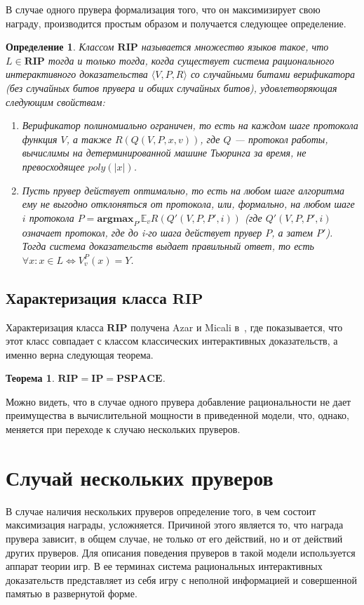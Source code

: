 \documentclass[14pt, a4paper]{extreport}
\newtheorem{theorem}{\indent Теорема}
\newtheorem{definition}{\indent Определение}
\newcommand{\poly}{\textit{poly}}
\begin{document}
В случае одного прувера формализация того, что он максимизирует свою награду, производится простым образом и получается следующее определение.
\begin{definition}\label{rip}
    Классом $\textbf{RIP}$ называется множество языков такое, что $L \in \textbf{RIP}$ тогда и только тогда, когда существует система рационального интерактивного доказательства $\langle V, P, R\rangle$ со случайными битами верификатора (без случайных битов прувера и общих случайных битов), удовлетворяющая следующим свойствам:
    \begin{enumerate}
        \item Верификатор полиномиально ограничен, то есть на каждом шаге протокола функция $V$, а также $R(Q(V, P, x, v))$, где $Q$ --- протокол работы, вычислимы на детерминированной машине Тьюринга за время, не превосходящее $\poly(|x|)$.
        \item Пусть прувер действует оптимально, то есть на любом шаге алгоритма ему не выгодно отклоняться от протокола, или, формально, на любом шаге $i$ протокола $P = \textbf{argmax}_{P'} \mathbb{E}_v R(Q'(V, P, P', i))$ (где $Q'(V, P, P', i)$ означает протокол, где до i-го шага действует прувер $P$, а затем $P'$). Тогда система доказательств выдает правильный ответ, то есть $\forall x: x \in L \iff V^{P}_{v}(x) = Y$.
        \end{enumerate}
    \end{definition}

    \section{Характеризация класса $\textbf{RIP}$}
    Характеризация класса $\textbf{RIP}$ получена Azar и Micali в~\cite{azar2012rational}, где показывается, что этот класс совпадает с классом классических интерактивных доказательств, а именно верна следующая теорема.
    \begin{theorem}
        $\textbf{RIP} = \textbf{IP} = \textbf{PSPACE}$.
    \end{theorem}
    Можно видеть, что в случае одного прувера добавление рациональности не дает преимущества в вычислительной мощности в приведенной модели, что, однако, меняется при переходе к случаю нескольких пруверов.
        \chapter{Случай нескольких пруверов}
        В случае наличия нескольких пруверов определение того, в чем состоит максимизация награды, усложняется. Причиной этого является то, что награда прувера зависит, в общем случае, не только от его действий, но и от действий других пруверов. Для описания поведения пруверов в такой модели используется аппарат теории игр. В ее терминах система рациональных интерактивных доказательств представляет из себя игру с неполной информацией и совершенной памятью в развернутой форме.
\end{document}
